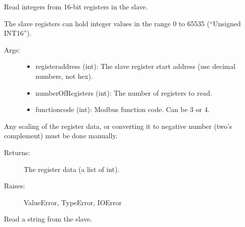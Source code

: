 \documentclass[letterpaper,10pt,english]{sphinxmanual}
\begin{document}
\begin{fulllineitems}
\begin{fulllineitems}
\begin{description}
\end{description}

\end{fulllineitems}


\begin{fulllineitems}
\label{minimalmodbus:minimalmodbus.Instrument.read_registers}
Read integers from 16-bit registers in the slave.

The slave registers can hold integer values in the range 0 to 65535 (``Unsigned INT16'').
\begin{description}
\item[{Args:}] \leavevmode\begin{itemize}
\item {} 
registeraddress (int): The slave register start address (use decimal numbers, not hex).

\item {} 
numberOfRegisters (int): The number of registers to read.

\item {} 
functioncode (int): Modbus function code. Can be 3 or 4.

\end{itemize}

\end{description}

Any scaling of the register data, or converting it to negative number (two's complement)
must be done manually.
\begin{description}
\item[{Returns:}] \leavevmode
The register data (a list of int).

\item[{Raises:}] \leavevmode
ValueError, TypeError, IOError

\end{description}

\end{fulllineitems}


\begin{fulllineitems}
\label{minimalmodbus:minimalmodbus.Instrument.read_string}
Read a string from the slave.


\end{fulllineitems}
\end{fulllineitems}
\end{document}
